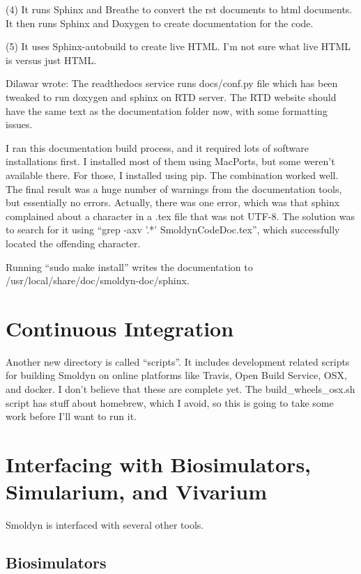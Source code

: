 \documentclass {scrbook}
\begin{document}
(4) It runs Sphinx and Breathe to convert the rst documents to html documents. It then runs Sphinx and Doxygen to create documentation for the code.

(5) It uses Sphinx-autobuild to create live HTML. I'm not sure what live HTML is versus just HTML.

Dilawar wrote: The readthedocs service runs docs/conf.py file which has been tweaked to run doxygen and sphinx on RTD server. The RTD website should have the same text as the documentation folder now, with some formatting issues.

I ran this documentation build process, and it required lots of software installations first. I installed most of them using MacPorts, but some weren't available there. For those, I installed using pip. The combination worked well. The final result was a huge number of warnings from the documentation tools, but essentially no errors. Actually, there was one error, which was that sphinx complained about a character in a .tex file that was not UTF-8. The solution was to search for it using ``grep -axv '.*' SmoldynCodeDoc.tex'', which successfully located the offending character.

Running ``sudo make install'' writes the documentation to /usr/local/share/doc/smoldyn-doc/sphinx.


\section{Continuous Integration}

Another new directory is called ``scripts''. It includes development related scripts for building Smoldyn on online platforms like Travis, Open Build Service, OSX, and docker. I don't believe that these are complete yet. The build\_wheels\_osx.sh script has stuff about homebrew, which I avoid, so this is going to take some work before I'll want to run it.


\section{Interfacing with Biosimulators, Simularium, and Vivarium}

Smoldyn is interfaced with several other tools.

\subsection{Biosimulators}
\end{document}
